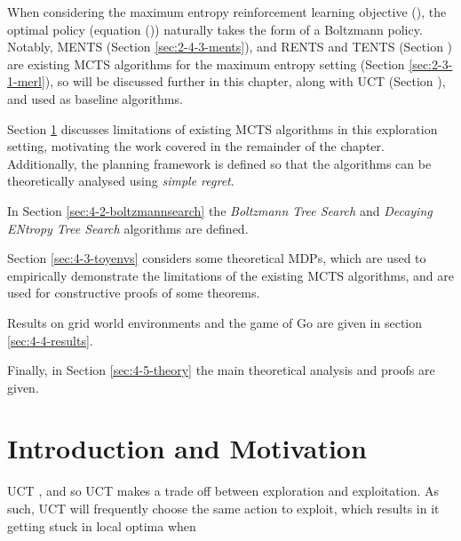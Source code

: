     When considering the maximum entropy reinforcement learning objective (), the optimal policy (equation ()) naturally takes the form of a Boltzmann policy. Notably, MENTS (Section \ref{sec:2-4-3-ments}), and RENTS and TENTS (Section ) are existing MCTS algorithms for the maximum entropy setting (Section \ref{sec:2-3-1-merl}), so will be discussed further in this chapter, along with UCT (Section ), and used as baseline algorithms.

    Section \ref{sec:4-1-intro} discusses limitations of existing MCTS algorithms in this exploration setting, motivating the work covered in the remainder of the chapter. Additionally, the planning framework is defined so that the algorithms can be theoretically analysed using \textit{simple regret}.
    
    In Section \ref{sec:4-2-boltzmannsearch} the \textit{Boltzmann Tree Search} and \textit{Decaying ENtropy Tree Search} algorithms are defined.

    Section \ref{sec:4-3-toyenvs} considers some theoretical MDPs, which are used to empirically demonstrate the limitations of the existing MCTS algorithms, and are used for constructive proofs of some theorems. 

    Results on grid world environments and the game of Go are given in section \ref{sec:4-4-results}. 

    Finally, in Section \ref{sec:4-5-theory} the main theoretical analysis and proofs are given.



    







\section{Introduction and Motivation}
\label{sec:4-1-intro}

    UCT  , and so UCT makes a trade off between exploration and exploitation. As such, UCT will frequently choose the same action to exploit, which results in it getting stuck in local optima when 

